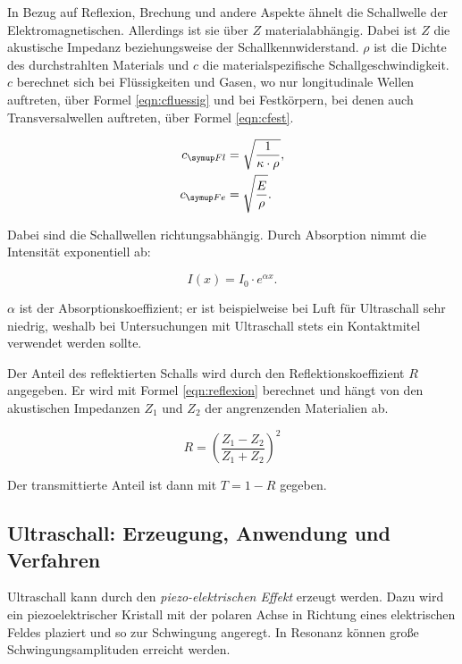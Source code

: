 In Bezug auf Reflexion, Brechung und andere Aspekte ähnelt die Schallwelle der
Elektromagnetischen. Allerdings ist sie über $Z$ materialabhängig.
Dabei ist $Z$ die akustische Impedanz beziehungsweise der Schallkennwiderstand. $\rho$
ist die Dichte des durchstrahlten Materials und $c$ die materialspezifische Schallgeschwindigkeit.
$c$ berechnet sich bei Flüssigkeiten und Gasen, wo nur longitudinale Wellen auftreten,
über Formel \eqref{eqn:cfluessig} und bei Festkörpern, bei denen auch Transversalwellen
auftreten, über Formel \eqref{eqn:cfest}.

\begin{align}
  c_{\g{Fl}} &= \sqrt{\frac{1}{\kappa \cdot \rho}}, \label{eqn:cfluessig}\\
  c_{\g{Fe}} &= \sqrt{\frac{E}{\rho}} \label{eqn:cfest}.
\end{align}

Dabei sind die Schallwellen richtungsabhängig. Durch Absorption nimmt die Intensität exponentiell ab:

\begin{equation}
  I(x) = I_0 \cdot e^{\alpha x} .
\end{equation}

$\alpha$ ist der Absorptionskoeffizient; er ist beispielweise bei Luft für Ultraschall sehr
niedrig, weshalb bei Untersuchungen mit Ultraschall stets ein Kontaktmitel verwendet werden sollte.

Der Anteil des reflektierten Schalls wird durch den Reflektionskoeffizient $R$ angegeben.
Er wird mit Formel \eqref{eqn:reflexion} berechnet und hängt von den akustischen Impedanzen
$Z_1$ und $Z_2$ der
angrenzenden Materialien ab.

\begin{equation}
  R = \left(\frac{Z_1 - Z_2}{Z_1 + Z_2} \right)^2
  \label{eqn:reflexion}
\end{equation}

Der transmittierte Anteil ist dann mit $T=1-R$ gegeben.

\subsection{Ultraschall: Erzeugung, Anwendung und Verfahren}

Ultraschall kann durch den \emph{piezo-elektrischen Effekt} erzeugt werden. Dazu wird ein piezoelektrischer
Kristall mit der polaren Achse in Richtung eines elektrischen Feldes plaziert und so zur Schwingung
angeregt. In Resonanz können große Schwingungsamplituden erreicht werden.

